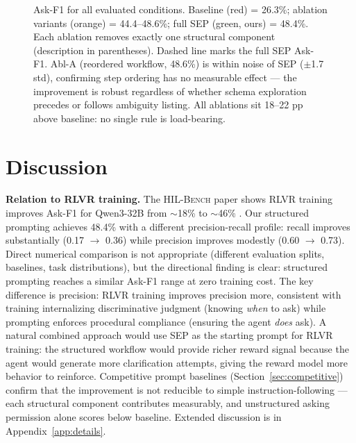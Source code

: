 \documentclass{article} %
\newcommand{\hilbench}{\textsc{HIL-Bench}}
\newcommand{\oursystem}{SEP} %
\begin{document}
\begin{figure}[t]
\caption{Ask-F1 for all evaluated conditions.
Baseline (red) = 26.3\%; ablation variants (orange) = 44.4--48.6\%;
full \oursystem{} (green, ours) = 48.4\%.
Each ablation removes exactly one structural component (description in parentheses).
Dashed line marks the full \oursystem{} Ask-F1.
Abl-A (reordered workflow, 48.6\%) is within noise of \oursystem{} ($\pm$1.7 std),
confirming step ordering has no measurable effect --- the improvement is robust
regardless of whether schema exploration precedes or follows ambiguity listing.
All ablations sit 18--22 pp above baseline: no single rule is load-bearing.}
\label{fig:ablation_bar}
\end{figure}

\section{Discussion}
\label{sec:discussion}

\textbf{Relation to RLVR training.}
The \hilbench{} paper shows RLVR training improves Ask-F1 for Qwen3-32B from
$\sim$18\% to $\sim$46\% \citep{hilbench2025}.
Our structured prompting achieves 48.4\% with a different precision-recall profile:
recall improves substantially (0.17 $\to$ 0.36) while precision improves modestly
(0.60 $\to$ 0.73).
Direct numerical comparison is not appropriate (different evaluation splits, baselines,
task distributions), but the directional finding is clear: structured prompting reaches
a similar Ask-F1 range at zero training cost.
The key difference is precision: RLVR training improves precision more, consistent
with training internalizing discriminative judgment (knowing \emph{when} to ask) while
prompting enforces procedural compliance (ensuring the agent \emph{does} ask).
A natural combined approach would use \oursystem{} as the starting prompt for RLVR
training: the structured workflow would provide richer reward signal because the agent
would generate more clarification attempts, giving the reward model more behavior to
reinforce.
Competitive prompt baselines (Section~\ref{sec:competitive}) confirm that the
improvement is not reducible to simple instruction-following --- each structural
component contributes measurably, and unstructured asking permission alone scores
below baseline.
Extended discussion is in Appendix~\ref{app:details}.
\end{document}
